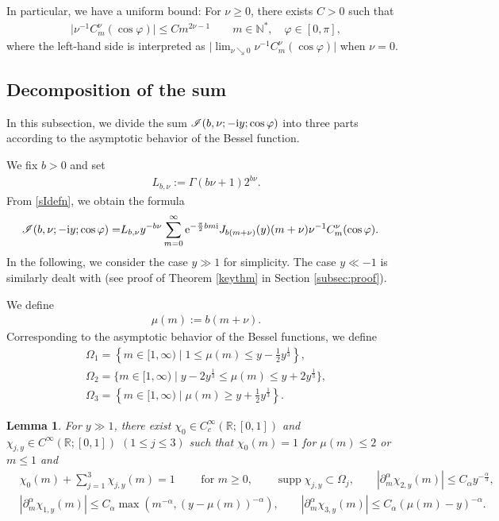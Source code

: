 \documentclass[pdftex]{sigma}
\numberwithin{equation}{section}
\newtheorem{Lemma}[Theorem]{Lemma}
\def\R{\mathbb{R}}%
\DeclareMathOperator{\supp}{supp}%
\def\a{\alpha}
\def\f{\varphi}
\def\m{\mu}
\def\n{\nu}
\def\pa{\partial}
\newcommand{\sI}{\mathscr{I}}
\begin{document}
In particular, we have a uniform bound: For $\n\geq 0$, there exists $C>0$ such that
\begin{align}\label{Gegenunif}
\big|\n^{-1}C_m^{\n}(\cos \f)\big|\leq Cm^{2\n-1}\qquad m\in \mathbb{N}^*,\quad \f\in[0,\pi],
\end{align}
where the left-hand side is interpreted as $\big|\lim_{\n\searrow 0}\n^{-1}C_m^{\n}(\cos \f)\big|$ when $\n=0$.

\subsection{Decomposition of the sum}\label{subsecdecom}

In this subsection, we divide the sum $\sI(b,\nu;- {\rm i}y;\cos\f)$ into three parts according to the asymptotic behavior of the Bessel function.

We fix $b>0$ and set
\begin{align}\label{cbndef}
L_{b,\n}:=\Gamma(b\nu+1)2^{b\n}.
\end{align}
From \eqref{sIdefn}, we obtain the formula
\begin{align}\label{sumbesell}
\sI(b,\nu;- {\rm i}y;\cos\f)=&L_{b,\n}y^{-b\n}\sum_{m=0}^{\infty}{\rm e}^{-\frac{\pi}{2}bm{\rm i}}J_{b(m+\n)}(y)(m+\nu)\n^{-1}C^{\nu}_m(\cos\f).
\end{align}
In the following, we consider the case $y\gg 1$ for simplicity. The case $y\ll -1$ is similarly dealt with (see proof of Theorem \ref{keythm} in Section \ref{subsec:proof}).






We define
\begin{align}\label{muemudef}
\m(m):=b(m+\n).
\end{align}
Corresponding to the asymptotic behavior of the Bessel functions, we define
\begin{gather*}
\Omega_1=\left\{m\in[1,\infty)\mid 1\leq \m(m)\leq y-\frac{1}{2}y^{\frac{1}{3}}\right\},\\ \Omega_2=\big\{m\in[1,\infty)\mid y-2y^{\frac{1}{3}}\leq \m(m)\leq y+2y^{\frac{1}{3}}\big\},\\
\Omega_3=\left\{m\in[1,\infty)\mid \m(m)\geq y+\frac{1}{2}y^{\frac{1}{3}}\right\}.
\end{gather*}

\begin{Lemma}\label{Cutoff}
For $y\gg 1$,
there exist $\chi_0\in C_c^{\infty}(\R;[0,1])$ and $\chi_{j,y}\in C^{\infty}(\R;[0,1])$ $(1\le j\le 3)$ such that $\chi_0(m)=1$ for $\m(m)\leq 2$ or $m\leq 1$ and
\begin{align}
&\chi_0(m)+\sum_{j=1}^3\chi_{j,y}(m)=1\qquad \text{ for $m\geq 0$},\qquad \supp \chi_{j,y}\subset \Omega_j,\qquad |\pa_m^{\a}\chi_{2,y}(m)|\leq C_{\a}y^{-\frac{\a}{3}},\nonumber\\
&|\pa_m^{\a}\chi_{1,y}(m)|\leq C_{\a}\max(m^{-\a}, (y-\m(m))^{-\a}),\qquad |\pa_m^{\a}\chi_{3,y}(m)|\leq C_{\a}(\m(m)-y)^{-\a}\label{POUproper}.
\end{align}
\end{Lemma}
\end{document}
